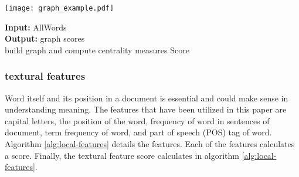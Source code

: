 \documentclass[3p]{elsarticle}
\begin{document}
\begin{minipage}{\textwidth}
    \centering
    \texttt{[image: graph\_example.pdf]}
    \label{fig:graph_example}
\end{minipage}
    
\begin{algorithm}
 \SetAlgoLined
  \textbf{Input:} AllWords \\
 \textbf{Output:} graph scores \\
 
 \caption{build graph and compute centrality measures Score}
 \label{alg:graph-features}
 \end{algorithm}
\subsubsection{textural features}
Word itself and its position in a document is essential and could make sense in understanding meaning. The features that have been utilized in this paper are capital letters, the position of the word, frequency of word in sentences of document, term frequency of word, and part of speech (POS) tag of word. Algorithm \ref{alg:local-features} details the features. Each of the features calculates a score. Finally, the textural feature score calculates in algorithm \ref{alg:local-features}.
\end{document}
